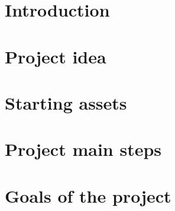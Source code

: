 \documentclass[a4paper, 12pt, oneside]{book}
\begin{document}
\chapter{Introduction}


\chapter{Project idea}
\chapter{Starting assets}
\chapter{Project main steps}
\chapter{Goals of the project}



\clearpage
\printbibliography[
heading=bibintoc,
title={References}
]
\clearpage
\listoffigures
{}
\clearpage
\listoftables
{}
\clearpage
\end{document}
